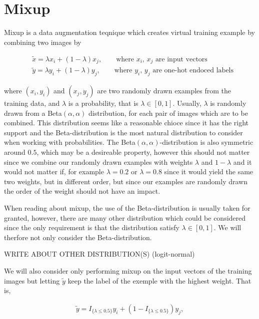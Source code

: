 \documentclass{article}
\begin{document}
\section{Mixup}

Mixup is a data augmentation teqnique which creates virtual training example by combining two images by 

\begin{align*}
 &\tilde{x} = \lambda x_i + (1-\lambda) x_j, \qquad \text{where $x_i$, $x_j$ are input vectors} \\
 &\tilde{y} = \lambda y_i + (1-\lambda) y_j, \qquad \text{where $y_i$, $y_j$ are one-hot endoced labels}
\end{align*}


where $(x_i, y_i)$ and $(x_j, y_j)$ are two randomly drawn examples from the training data, and $\lambda$ 
is a probability, that is $\lambda \in [0,1]$. Usually, $\lambda$ is randomly drawn from a Beta$(\alpha, \alpha)$ 
distribution, for each pair of images which are to be combined. This distribution seems like a 
reasonable chioce since it has the right support and the Beta-distribution is the most natural distribution to
consider when working with probabilities. The Beta$(\alpha, \alpha)$-distribution is also symmetric around $0.5$, which may be 
a desireable property, however this should not matter since we combine our randomly drawn examples with weights $\lambda$ and $1-\lambda$ and 
it would not matter if, for example $\lambda = 0.2$ or $\lambda = 0.8$ since it would yield the same two weights, but in different order, but 
since our examples are randomly drawn the order of the weight should not have an impact. 

When reading about mixup, the use of the Beta-distribution is usually taken for granted, however, there are many other distribution which 
could be considered since the only requirement is that the distribution satisfy $\lambda \in [0,1]$. We will therfore not only consider the 
Beta-distribution. 

WRITE ABOUT OTHER DISTRIBUTION(S) (logit-normal)

We will also consider only performing mixup on the input vectors of the training images but letting $\tilde{y}$ keep the label of the exemple 
with the highest weight. That is,

\begin{align*}
 \tilde{y} = I_{\{ \lambda \leq 0.5 \}} y_i + (1-I_{\{ \lambda \leq 0.5 \}}) y_j, 
\end{align*}
\end{document}
